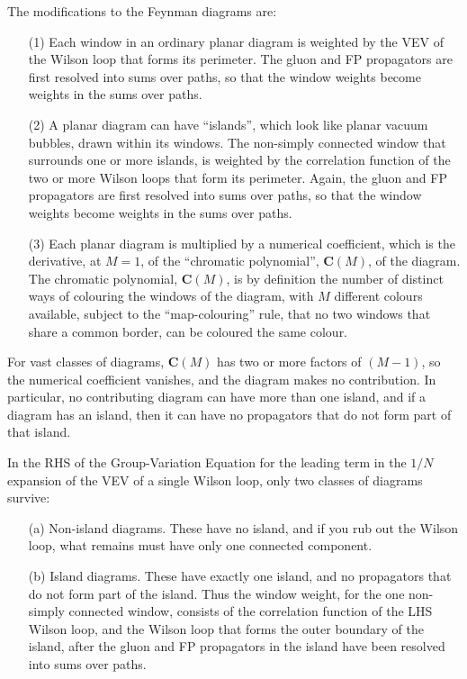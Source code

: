 \documentclass[a4paper,12pt,oneside]{article}
\begin{document}
The modifications to the Feynman diagrams are:
\begin{itemize}
\item[(1)] Each window in an ordinary planar diagram is weighted by the VEV of the
Wilson loop that forms its perimeter.  The gluon and FP propagators are
first resolved into sums over paths, so that the window weights become
weights in the sums over paths.
\item[(2)] A planar diagram can have ``islands'', which look like planar vacuum
bubbles, drawn within its windows.  The non-simply connected window that
surrounds one or more islands, is weighted by the correlation function of
the two or more Wilson loops that form its perimeter.  Again, the gluon and
FP propagators are first resolved into sums over paths, so that the window
weights become weights in the sums over paths.
\item[(3)] Each planar diagram is multiplied by a numerical coefficient, which is
the derivative, at $M=1$, of the ``chromatic polynomial'', $\mathbf{C}(M)$, of
the diagram.  The chromatic polynomial, $\mathbf{C}(M)$, is by definition
the number of distinct ways of colouring the windows of the diagram, with
$M$ different colours available, subject to the ``map-colouring'' rule, that
no two windows that share a common border, can be coloured the same colour.
\end{itemize}

For vast classes of diagrams, $\mathbf{C}(M)$ has two or more factors of
$(M-1)$, so the numerical coefficient vanishes, and the diagram makes no
contribution.  In particular, no contributing diagram can have more than one
island, and if a diagram has an island, then it can have no propagators that
do not form part of that island.

In the RHS of the Group-Variation Equation
for the leading term in the $1/N$ expansion of the VEV of a single Wilson
loop, only two classes of diagrams survive:
\begin{itemize}
	\item[(a)] Non-island diagrams.  These have no island, and if you rub out the
Wilson loop, what remains must have only one connected component.
\item[(b)] Island diagrams.  These have exactly one island, and no propagators that
do not form part of the island.  Thus the window weight, for the one
non-simply connected window, consists of the correlation function of the LHS
Wilson loop, and the Wilson loop that forms the outer boundary of the
island, after the gluon and FP propagators in the island have been resolved
into sums over paths.
\end{itemize}
\end{document}
